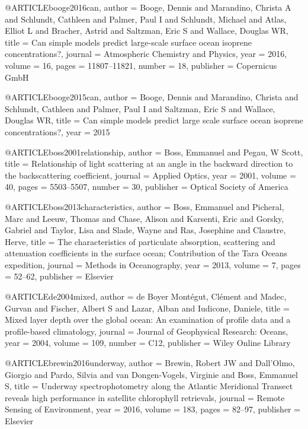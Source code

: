 @ARTICLE{booge2016can,
  author = {Booge, Dennis and Marandino, Christa A and Schlundt, Cathleen and
	Palmer, Paul I and Schlundt, Michael and Atlas, Elliot L and Bracher,
	Astrid and Saltzman, Eric S and Wallace, Douglas WR},
  title = {Can simple models predict large-scale surface ocean isoprene concentrations?},
  journal = {Atmospheric Chemistry and Physics},
  year = {2016},
  volume = {16},
  pages = {11807--11821},
  number = {18},
  publisher = {Copernicus GmbH}
}

@ARTICLE{booge2015can,
  author = {Booge, Dennis and Marandino, Christa and Schlundt, Cathleen and Palmer,
	Paul I and Saltzman, Eric S and Wallace, Douglas WR},
  title = {Can simple models predict large scale surface ocean isoprene concentrations?},
  year = {2015}
}

@ARTICLE{boss2001relationship,
  author = {Boss, Emmanuel and Pegau, W Scott},
  title = {Relationship of light scattering at an angle in the backward direction
	to the backscattering coefficient},
  journal = {Applied Optics},
  year = {2001},
  volume = {40},
  pages = {5503--5507},
  number = {30},
  publisher = {Optical Society of America}
}

@ARTICLE{boss2013characteristics,
  author = {Boss, Emmanuel and Picheral, Marc and Leeuw, Thomas and Chase, Alison
	and Karsenti, Eric and Gorsky, Gabriel and Taylor, Lisa and Slade,
	Wayne and Ras, Josephine and Claustre, Herve},
  title = {The characteristics of particulate absorption, scattering and attenuation
	coefficients in the surface ocean; Contribution of the Tara Oceans
	expedition},
  journal = {Methods in Oceanography},
  year = {2013},
  volume = {7},
  pages = {52--62},
  publisher = {Elsevier}
}

@ARTICLE{de2004mixed,
  author = {de Boyer Mont{\'e}gut, Cl{\'e}ment and Madec, Gurvan and Fischer,
	Albert S and Lazar, Alban and Iudicone, Daniele},
  title = {Mixed layer depth over the global ocean: An examination of profile
	data and a profile-based climatology},
  journal = {Journal of Geophysical Research: Oceans},
  year = {2004},
  volume = {109},
  number = {C12},
  publisher = {Wiley Online Library}
}

@ARTICLE{brewin2016underway,
  author = {Brewin, Robert JW and Dall'Olmo, Giorgio and Pardo, Silvia and van
	Dongen-Vogels, Virginie and Boss, Emmanuel S},
  title = {Underway spectrophotometry along the Atlantic Meridional Transect
	reveals high performance in satellite chlorophyll retrievals},
  journal = {Remote Sensing of Environment},
  year = {2016},
  volume = {183},
  pages = {82--97},
  publisher = {Elsevier}
}

